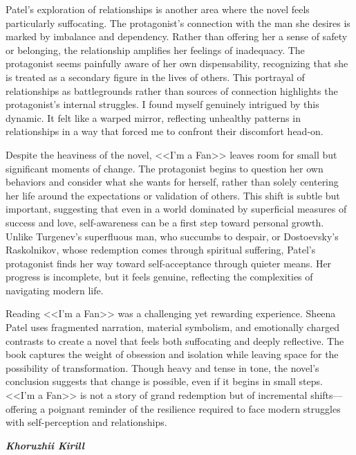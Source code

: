 Patel’s exploration of relationships is another area where the novel feels particularly suffocating. The protagonist’s connection with the man she desires is marked by imbalance and dependency. Rather than offering her a sense of safety or belonging, the relationship amplifies her feelings of inadequacy. The protagonist seems painfully aware of her own dispensability, recognizing that she is treated as a secondary figure in the lives of others. This portrayal of relationships as battlegrounds rather than sources of connection highlights the protagonist’s internal struggles. I found myself genuinely intrigued by this dynamic. It felt like a warped mirror, reflecting unhealthy patterns in relationships in a way that forced me to confront their discomfort head-on.

Despite the heaviness of the novel, <<I’m a Fan>> leaves room for small but significant moments of change. The protagonist begins to question her own behaviors and consider what she wants for herself, rather than solely centering her life around the expectations or validation of others. This shift is subtle but important, suggesting that even in a world dominated by superficial measures of success and love, self-awareness can be a first step toward personal growth. Unlike Turgenev’s superfluous man, who succumbs to despair, or Dostoevsky’s Raskolnikov, whose redemption comes through spiritual suffering, Patel’s protagonist finds her way toward self-acceptance through quieter means. Her progress is incomplete, but it feels genuine, reflecting the complexities of navigating modern life.

Reading <<I’m a Fan>> was a challenging yet rewarding experience. Sheena Patel uses fragmented narration, material symbolism, and emotionally charged contrasts to create a novel that feels both suffocating and deeply reflective. The book captures the weight of obsession and isolation while leaving space for the possibility of transformation. Though heavy and tense in tone, the novel’s conclusion suggests that change is possible, even if it begins in small steps. <<I’m a Fan>> is not a story of grand redemption but of incremental shifts—offering a poignant reminder of the resilience required to face modern struggles with self-perception and relationships.


\phantom{42} \hfill \textit{\textbf{Khoruzhii Kirill}}